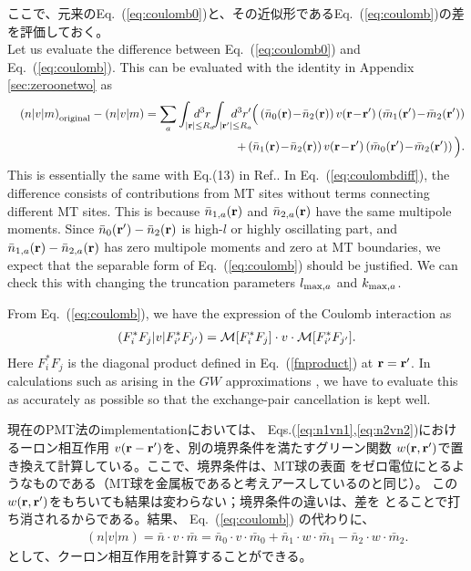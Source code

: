 \documentclass[twocolumn,showpacs,preprintnumbers,amsmath,amssymb,floatfix]{revtex4-1}
\newcommand{\bfr}{{\bf r}}
\newcommand{\req}[1]{\mbox{Eq.~\!(\ref{#1})}}
\def\MM{{\cal M}}
\def\inta{\int_{|\bfr|\leq R_a}\!\!\!\!\!\!\!\!\!\!\!\!}
\def\intad{\int_{|\bfr'|\leq R_a}\!\!\!\!\!\!\!\!\!\!\!\!}
\def\MM{{\cal M}}
\def\inta{\int_{|\bfr|\leq R_a}\!\!\!\!\!\!\!\!\!\!\!\!}
\def\intad{\int_{|\bfr'|\leq R_a}\!\!\!\!\!\!\!\!\!\!\!\!}
\begin{document}
\begin{widetext}
ここで、元来の\req{eq:coulomb0}と、その近似形である\req{eq:coulomb}の差
を評価しておく。\\
Let us evaluate the difference between \req{eq:coulomb0} and \req{eq:coulomb}.
This can be evaluated with the identity in Appendix \ref{sec:zeroonetwo} as
\begin{eqnarray}
&&\left(n|v|m\right)_{\rm original}-\left(n|v|m\right)= 
\sum_a \inta d^3r \intad d^3r'\Big(
\left( \bar{n}_0(\bfr) \!-\! \bar{n}_2(\bfr) \right) 
v(\bfr\!-\!\bfr') \left( \bar{m}_1(\bfr')\!-\!\bar{m}_2(\bfr') \right)  \nonumber \\
&&+\left( \bar{n}_1(\bfr)\!-\!\bar{n}_2(\bfr) \right) 
v(\bfr\!-\!\bfr') \left( \bar{m}_0(\bfr')\!-\!\bar{m}_2(\bfr') \right)\Big).
\label{eq:coulombdiff}
\end{eqnarray}
This is essentially the same with Eq.(13) in Ref.\cite{kresse99}.  In
\req{eq:coulombdiff}, the difference consists of contributions from MT
sites without terms connecting different MT sites. This is because
$\bar{n}_{1,a}(\bfr)$ and $\bar{n}_{2,a}(\bfr)$ have the same multipole
moments.  Since $\bar{n}_0(\bfr') - \bar{n}_2(\bfr)$ is high-$l$ or
highly oscillating part, and $\bar{n}_{1,a}(\bfr)-\bar{n}_{2,a}(\bfr)$
has zero multipole moments and zero at MT boundaries, we expect that the
separable form of \req{eq:coulomb} should be justified. We can check
this with changing the truncation parameters $l_{{\rm max},a}$ and 
$k_{{\rm max},a}$.

From \req{eq:coulomb}, we have the expression of the Coulomb
interaction as
\begin{eqnarray}
\left(F^*_i F_j|v|F^*_{i'}F_{j'}\right) = \MM[F^*_iF_j] \cdot v \cdot \MM[F^*_{i'}F_{j'}].
\label{eq:ffvff}
\end{eqnarray}
Here $F^*_i F_j$ is the diagonal product defined in \req{fnproduct} at
$\bfr=\bfr'$.  In calculations such as arising in the $GW$
approximations \cite{kotani07a}, we have to evaluate this as accurately
as possible so that the exchange-pair cancellation is kept well.

現在のPMT法のimplementationにおいては、
Eqs.(\ref{eq:n1vn1},\ref{eq:n2vn2})におけるーロン相互作用
$v(\bfr-\bfr')$を、別の境界条件を満たすグリーン関数
$w(\bfr,\bfr')$で置き換えて計算している。ここで、境界条件は、MT球の表面
をゼロ電位にとるようなものである（MT球を金属板であると考えアースしているのと同じ）。
この$w(\bfr,\bfr')$をもちいても結果は変わらない；境界条件の違いは、差を
とることで打ち消されるからである。結果、
\req{eq:coulomb} の代わりに、
\begin{eqnarray}
&&\left(n|v|m\right)=\bar{n} \cdot v \cdot \bar{m} = 
\bar{n}_0 \cdot v \cdot \bar{m}_0 + \bar{n}_{1} \cdot w
\cdot \bar{m}_{1} - \bar{n}_{2} \cdot w \cdot \bar{m}_{2}. \label{eq:defnvm}
\end{eqnarray}
として、クーロン相互作用を計算することができる。



\end{widetext}
\end{document}
